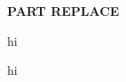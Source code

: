 \begin{homeworkProblem}
    
    \textbf{PART REPLACE}

    hi

    hi

\end{homeworkProblem}

\pagebreak
